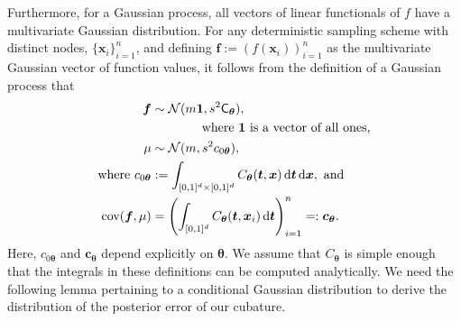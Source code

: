 \documentclass[twocolumn]{svjour3}          %
\newcommand{\bm}[1]{\boldsymbol{#1}}
\newcommand{\dif}[1]{\text{d}{#1}}
\newcommand{\D}[1]{\text{d}{#1}}
\newcommand{\vtheta}{{\bm{\theta}}}
\newcommand{\vc}{\bm{c}}
\newcommand{\vf}{\bm{f}}
\newcommand{\vt}{\bm{t}}
\newcommand{\vx}{\bm{x}}
\newcommand{\vone}{\bm{1}}
\newcommand{\mCtheta}{{\mathsf{C}_{\vtheta}}}
\newcommand{\cov}{{\textup{cov}}}
\newcommand{\calN}{\mathcal{N}}
\begin{document}
Furthermore, for a Gaussian process, all vectors of linear functionals of $f$ have a multivariate Gaussian distribution. For any deterministic sampling scheme with distinct nodes, $\{\vx_i\}_{i=1}^n$, and defining  $\vf  := \left( f(\vx_i)\right)_{i=1}^n$ as the multivariate Gaussian vector of function values, it follows from the definition of a Gaussian process that 
\begin{subequations} \label{eqn:fGaussDist}
\begin{align}
\vf  & \sim \calN(m \vone, s^2 \mCtheta), \\
\nonumber & \qquad \qquad \text{where $\vone$ is a vector of all ones,}\\
\mu & \sim \calN(m, s^2 c_{0\vtheta}), 
\\
\text{where }
c_{0\vtheta} &:= \int_{[0,1]^{d}\times [0,1]^{d}} C_\vtheta(\vt,\vx) \, \dif{\vt} \, \dif{\vx}, \text{ and}\\
\cov(\vf, \mu) &= \left(  \int_{[0,1]^d} C_\vtheta(\vt,\vx_i) \, \D \vt \right)_{i=1}^n  =: \vc_\vtheta.
\end{align}
\end{subequations}
Here, $c_{0\vtheta}$ and $\vc_\vtheta$ depend explicitly on $\vtheta$.  We assume that $C_\vtheta$ is simple enough that the integrals in these definitions can be computed analytically.  We need the following lemma pertaining to a conditional Gaussian distribution to derive the distribution of the posterior error of our cubature. 
\end{document}
